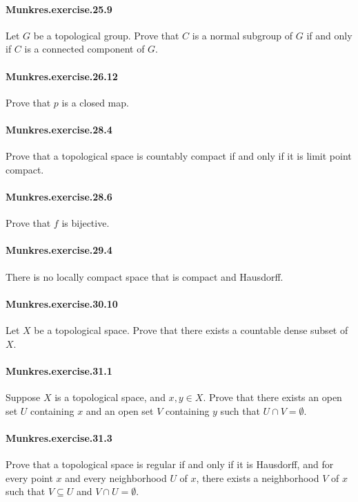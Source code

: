 \documentclass{article}
\begin{document}
{\paragraph{Munkres.exercise.25.9} Let $G$ be a topological group. Prove that $C$ is a normal subgroup of $G$ if and only if $C$ is a connected component of $G$.

\paragraph{Munkres.exercise.26.12} Prove that $p$ is a closed map.

\paragraph{Munkres.exercise.28.4} Prove that a topological space is countably compact if and only if it is limit point compact.

\paragraph{Munkres.exercise.28.6} Prove that $f$ is bijective.

\paragraph{Munkres.exercise.29.4} There is no locally compact space that is compact and Hausdorff.

\paragraph{Munkres.exercise.30.10} Let $X$ be a topological space. Prove that there exists a countable dense subset of $X$.

\paragraph{Munkres.exercise.31.1} Suppose $X$ is a topological space, and $x, y \in X$. Prove that there exists an open set $U$ containing $x$ and an open set $V$ containing $y$ such that $U ∩ V = ∅$.

\paragraph{Munkres.exercise.31.3} Prove that a topological space is regular if and only if it is Hausdorff, and for every point $x$ and every neighborhood $U$ of $x$, there exists a neighborhood $V$ of $x$ such that $V \subseteq U$ and $V \cap U = \emptyset$.

}
\end{document}

